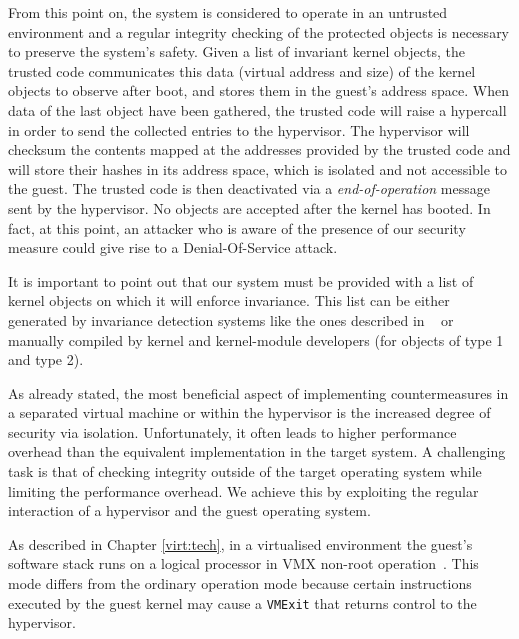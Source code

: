 From this point on, the system is considered to operate in an untrusted environment and a regular integrity checking of the protected objects is necessary to preserve the system's safety.
Given a list of invariant kernel objects, the trusted code communicates this data (virtual address and size) of the kernel objects to observe after boot, and stores them in the guest's address space. When data of the last object have been gathered, the trusted code will raise a hypercall in order to send the collected entries to the hypervisor. The hypervisor will checksum the contents mapped at the addresses provided by the trusted code and will store their hashes in its address space, which is isolated and not accessible to the guest. The trusted code is then deactivated via a \emph{end-of-operation} message sent by the hypervisor. No objects are accepted after the kernel has booted. In fact, at this point, an attacker who is aware of the presence of our security measure could give rise to a Denial-Of-Service attack.

It is important to point out that our system must be provided with a list of kernel objects on which it will enforce invariance. This list can be either generated by invariance detection systems like the ones described in ~\cite{HookSafe,6,7,8} or manually compiled by kernel and kernel-module developers (for objects of type 1 and type 2).

As already stated, the most beneficial aspect of implementing countermeasures in a separated virtual machine or within the hypervisor is the increased degree of security via isolation. Unfortunately, it often leads to higher performance overhead than the equivalent implementation in the target system. 
A challenging task is that of checking integrity outside of the target operating system while limiting the performance overhead. We achieve this by exploiting the regular interaction of a hypervisor and the guest operating system. 

As described in Chapter \ref{virt:tech}, in a virtualised environment the guest's software stack runs on a logical processor in VMX non-root operation~\cite{Intel2007}. This mode differs from the ordinary operation mode because certain instructions executed by the guest kernel may cause a \texttt{VMExit} that returns control to the hypervisor.


